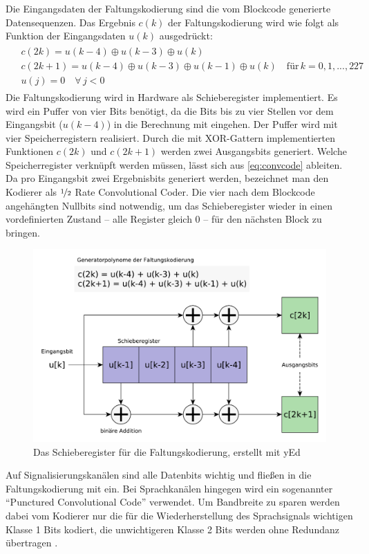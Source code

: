 Die Eingangsdaten der Faltungskodierung sind die vom Blockcode generierte Datensequenzen. Das Ergebnis $c(k)$ der Faltungskodierung wird wie folgt als Funktion der Eingangsdaten $u(k)$ ausgedrückt:
\begin{align}\label{eq:convcode}
\begin{split}
& c(2k) = u(k-4) \oplus u(k-3) \oplus u(k) \\
& c(2k+1) = u(k-4) \oplus u(k-3) \oplus u(k-1) \oplus u(k) \quad \text{für} \, k = 0,1,...,227 \\
& u(j) = 0 \quad \forall \, j < 0
\end{split}
\end{align}\noindent
Die Faltungskodierung wird in Hardware als Schieberegister implementiert. Es wird ein Puffer von vier Bits benötigt, da die Bits bis zu vier Stellen vor dem Eingangsbit ($u(k-4)$) in die Berechnung mit eingehen. Der Puffer wird mit vier Speicherregistern realisiert. Durch die mit \ac{XOR}-Gattern implementierten Funktionen $c(2k)$ und $c(2k+1)$ werden zwei Ausgangsbits generiert. Welche Speicherregister verknüpft werden müssen, lässt sich aus \autoref{eq:convcode} ableiten. Da pro Eingangsbit zwei Ergebnisbits generiert werden, bezeichnet man den Kodierer als $\nicefrac{1}{2}$ Rate Convolutional Coder. Die vier nach dem Blockcode angehängten Nullbits sind notwendig, um das Schieberegister wieder in einen vordefinierten Zustand -- alle Register gleich 0 -- für den nächsten Block zu bringen.

\begin{figure}[H]
  \begin{center}
    \includegraphics[width=1.0\textwidth]{figures/conv_code_shift_reg.pdf}
  \end{center}
  \caption[Das Schieberegister für die Faltungskodierung]{Das Schieberegister für die Faltungskodierung, erstellt mit yEd} \label{fig:conv_code_shift_reg} 
\end{figure}
Auf Signalisierungskanälen sind alle Datenbits wichtig und fließen in die Faltungskodierung mit ein. Bei Sprachkanälen hingegen wird ein sogenannter "`Punctured Convolutional Code"' verwendet. Um Bandbreite zu sparen werden dabei vom Kodierer nur die für die Wiederherstellung des Sprachsignals wichtigen Klasse 1 Bits kodiert, die unwichtigeren Klasse 2 Bits werden ohne Redundanz übertragen . 


